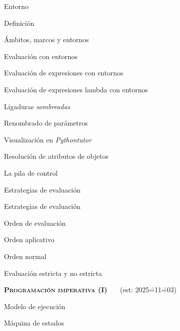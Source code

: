 \begin{longenum}
    \begin{longenum}
        \item Entorno
        \begin{longenum}
            \item Definición
            \item Ámbitos, marcos y entornos
        \end{longenum}
        \item Evaluación con entornos
        \begin{longenum}
            \item Evaluación de expresiones con entornos
            \item Evaluación de expresiones lambda con entornos
            \begin{longenum}
                \item Ligaduras \textit{sombreadas}
                \item Renombrado de parámetros
                \item Visualización en \textit{Pythontutor}
            \end{longenum}
            \item Resolución de atributos de objetos
        \end{longenum}
        \item La pila de control
        \item Estrategias de evaluación \opcional\
        \begin{longenum}
            \item Estrategias de evaluación
            \item Orden de evaluación
            \begin{longenum}
                \item Orden aplicativo
                \item Orden normal
            \end{longenum}
            \item Evaluación estricta y no estricta
        \end{longenum}
    \end{longenum}
    \item \textbf{\textsc{Programación imperativa (I)}} \ce{1e}\ \ev1\ \ra1\ (est: 2025\==11\==03)
    \begin{longenum}
        \item Modelo de ejecución
        \begin{longenum}
            \item Máquina de estados

\end{longenum}
\end{longenum}
\end{longenum}
